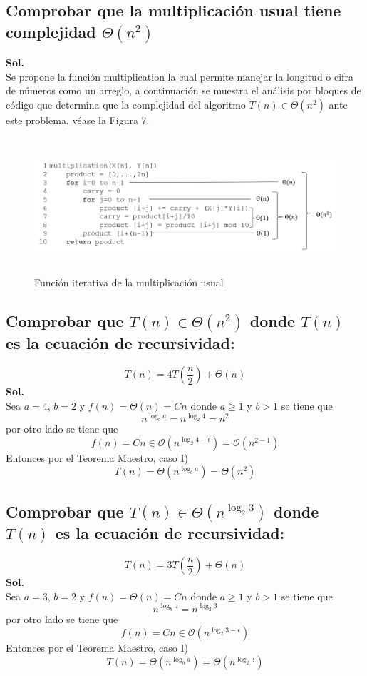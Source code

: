 \documentclass[12pt,twoside]{article}
\begin{document}
    \subsection{Comprobar que la multiplicaci\'on usual tiene complejidad \texorpdfstring{$\Theta(n^{2})$}{Lg}}
    \textbf{Sol.}\\
    Se propone la funci\'on multiplication la cual permite manejar la longitud o cifra de n\'umeros como un arreglo, a continuaci\'on se muestra el an\'alisis por bloques de c\'odigo que determina que la complejidad del algoritmo $T(n)\in\Theta(n^{2})$ ante este problema, v\'ease la Figura 7.
    \begin{figure}[h]
        \centering
        \includegraphics[height=5cm]{imagenes/A1.png}
        \caption{Funci\'on iterativa de la multiplicaci\'on usual}
        \label{fig:my_label}
    \end{figure}
    
    \subsection{Comprobar que \texorpdfstring{$T(n)\in\Theta(n^{2})$}{Lg} donde \texorpdfstring{$T(n)$}{Lg} es la ecuaci\'on de recursividad:}
    $$T(n)=4T(\frac{n}{2})+\Theta(n)$$
    \textbf{Sol.}\\
    Sea $a=4$, $b=2$ y $f(n)=\Theta(n)=Cn$ donde $a\geq1$ y $b>1$ se tiene que
    $$n^{\log_b{a}}=n^{\log_2{4}}=n^{2}$$
    por otro lado se tiene que
    $$f(n)=Cn\in\mathcal{O}(n^{\log_2{4}-\epsilon})=\mathcal{O}(n^{2-1})$$
    Entonces por el Teorema Maestro, caso I)
    $$T(n)=\Theta(n^{\log_b{a}})=\Theta(n^{2})$$
    
    \subsection{Comprobar que \texorpdfstring{$T(n)\in\Theta(n^{\log_2{3}})$}{Lg} donde \texorpdfstring{$T(n)$}{Lg} es la ecuaci\'on de recursividad:}
    $$T(n)=3T(\frac{n}{2})+\Theta(n)$$
    \textbf{Sol.}\\
    Sea $a=3$, $b=2$ y $f(n)=\Theta(n)=Cn$ donde $a\geq1$ y $b>1$ se tiene que
    $$n^{\log_b{a}}=n^{\log_2{3}}$$
    por otro lado se tiene que
    $$f(n)=Cn\in\mathcal{O}(n^{\log_2{3}-\epsilon})$$
    Entonces por el Teorema Maestro, caso I)
    $$T(n)=\Theta(n^{\log_b{a}})=\Theta(n^{\log_2{3}})$$
    
\end{document}
